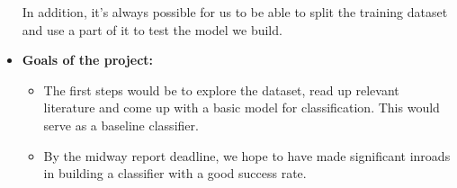 \documentclass[11pt]{article}
\begin{document}
\begin{itemize}
In addition, it's always possible for us to be able to split the training dataset and use a part of it to test the model we build.

\item \textbf{Goals of the project: }
\begin{itemize}
\item The first steps would be to explore the dataset, read up relevant literature and come up with a basic model for classification. This would serve as a baseline classifier.
\item By the midway report deadline, we hope to have made significant inroads in building a classifier with a good success rate.
\end{itemize}

\end{itemize}
\end{document}
